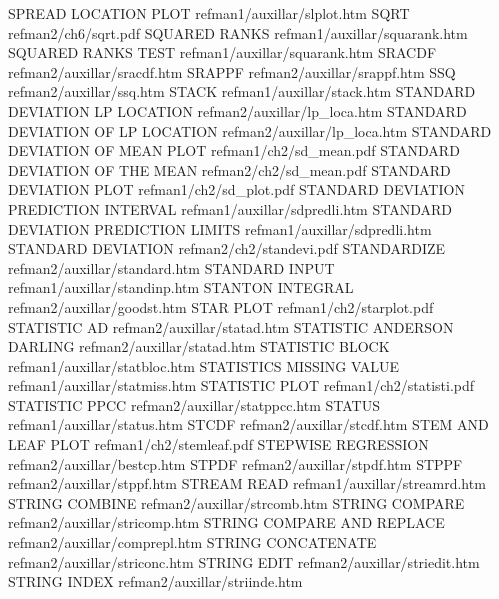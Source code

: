 SPREAD LOCATION PLOT                    refman1/auxillar/slplot.htm
SQRT                                    refman2/ch6/sqrt.pdf
SQUARED RANKS                           refman1/auxillar/squarank.htm
SQUARED RANKS TEST                      refman1/auxillar/squarank.htm
SRACDF                                  refman2/auxillar/sracdf.htm
SRAPPF                                  refman2/auxillar/srappf.htm
SSQ                                     refman2/auxillar/ssq.htm
STACK                                   refman1/auxillar/stack.htm
STANDARD DEVIATION LP LOCATION          refman2/auxillar/lp_loca.htm
STANDARD DEVIATION OF LP LOCATION       refman2/auxillar/lp_loca.htm
STANDARD DEVIATION OF MEAN PLOT         refman1/ch2/sd_mean.pdf
STANDARD DEVIATION OF THE MEAN          refman2/ch2/sd_mean.pdf
STANDARD DEVIATION PLOT                 refman1/ch2/sd_plot.pdf
STANDARD DEVIATION PREDICTION INTERVAL  refman1/auxillar/sdpredli.htm
STANDARD DEVIATION PREDICTION LIMITS    refman1/auxillar/sdpredli.htm
STANDARD DEVIATION                      refman2/ch2/standevi.pdf
STANDARDIZE                             refman2/auxillar/standard.htm
STANDARD INPUT                          refman1/auxillar/standinp.htm
STANTON INTEGRAL                        refman2/auxillar/goodst.htm
STAR PLOT                               refman1/ch2/starplot.pdf
STATISTIC AD                            refman2/auxillar/statad.htm
STATISTIC ANDERSON DARLING              refman2/auxillar/statad.htm
STATISTIC BLOCK                         refman1/auxillar/statbloc.htm
STATISTICS MISSING VALUE                refman1/auxillar/statmiss.htm
STATISTIC PLOT                          refman1/ch2/statisti.pdf
STATISTIC PPCC                          refman2/auxillar/statppcc.htm
STATUS                                  refman1/auxillar/status.htm
STCDF                                   refman2/auxillar/stcdf.htm
STEM AND LEAF PLOT                      refman1/ch2/stemleaf.pdf
STEPWISE REGRESSION                     refman2/auxillar/bestcp.htm
STPDF                                   refman2/auxillar/stpdf.htm
STPPF                                   refman2/auxillar/stppf.htm
STREAM READ                             refman1/auxillar/streamrd.htm
STRING COMBINE                          refman2/auxillar/strcomb.htm
STRING COMPARE                          refman2/auxillar/stricomp.htm
STRING COMPARE AND REPLACE              refman2/auxillar/comprepl.htm
STRING CONCATENATE                      refman2/auxillar/striconc.htm
STRING EDIT                             refman2/auxillar/striedit.htm
STRING INDEX                            refman2/auxillar/striinde.htm
